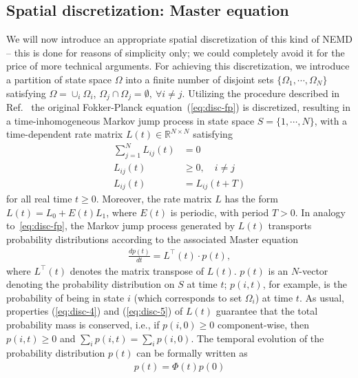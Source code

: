\documentclass[journal=jctcce,manuscript=article]{achemso}
\newcommand{\vect}[1]{#1}
\newcommand{\myphi}{\Phi}
\begin{document}
\subsection{Spatial discretization: Master equation}
We will now introduce an appropriate spatial discretization of this kind of NEMD --  this is done for reasons of simplicity only; we could completely avoid it for the price of more technical arguments.
For achieving this discretization, we 
introduce a partition of state space $\Omega$ into a finite number of disjoint
sets $\{ \Omega_1, \cdots, \Omega_N\}$ satisfying $\Omega = \cup_i \Omega_i$,
$\Omega_j\cap \Omega_j = \emptyset,\ \forall i\neq j$.
Utilizing the procedure described in Ref.~\cite{latorre2011structure} the original Fokker-Planck equation~(\ref{eq:disc-fp})
is discretized, resulting in a time-inhomogeneous Markov jump process in state
space $S = \{1, \cdots, N\}$, with a time-dependent rate
matrix $\vect L(t) \in \mathbb R^{N\times N}$ satisfying
\begin{align}\label{eq:disc-4}
\sum\limits_{j=1}^N L_{ij}(t) & =  0\\ \label{eq:disc-5}
L_{ij}(t) & \ge  0, \quad i\not= j\\
L_{ij}(t) & =  L_{ij}(t+T)
\end{align}
for all real time $t\geq 0$.
Moreover, the rate matrix $L$ has the form $\vect L(t)=\vect L_0+E(t)\vect L_1$,
where $E(t)$ is periodic, with period $T>0$.
In analogy to~\eqref{eq:disc-fp}, the Markov jump process generated by
$\vect L(t)$ transports probability distributions according to the associated Master equation
\begin{align}
  \label{eq:disc-master}
  \frac{d\vect p(t)}{dt} = \vect L^{\top}(t)\cdot \vect p(t),
\end{align}
where $\vect L^{\top}(t)$ denotes the matrix transpose of $\vect L(t)$. $\vect p(t)$ is an $N$-vector denoting the probability distribution on $S$ at time $t$; $p(i,t)$, for example, is the probability of being in state $i$ (which corresponds to set $\Omega_i$) at time $t$.
As usual,  properties (\ref{eq:disc-4}) and (\ref{eq:disc-5}) of
$\vect L(t)$ guarantee that the total probability mass is conserved,
i.e., if $p(i,0)\ge 0$ component-wise, then $p(i,t)\ge 0$ and $\sum_i
p(i,t) = \sum_ip(i,0)$.
The temporal evolution of the probability distribution $\vect p(t)$ can be formally written as
\begin{align}  \label{eq:disc-8}
\vect p(t)=\myphi(t)\vect p(0)
\end{align}
\end{document}
